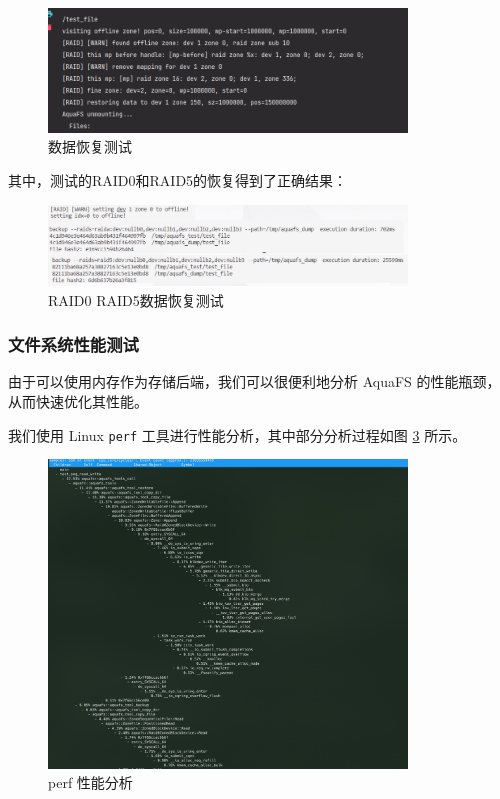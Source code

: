 \begin{figure}[htbp]
  \centering
  \includegraphics[width=0.85\textwidth]{fig/test-recovery}
  \caption{ 数据恢复测试 }
  \label{test-recovery}
\end{figure}

其中，测试的RAID0和RAID5的恢复得到了正确结果：
\begin{figure}[htbp]
  \centering
  \includegraphics[width=0.85\textwidth]{fig/test_recovery_1}
  \caption{ RAID0 RAID5数据恢复测试 }
  \label{test-recovery_1}
\end{figure}

\subsubsection{文件系统性能测试}

由于可以使用内存作为存储后端，我们可以很便利地分析 AquaFS 的性能瓶颈，从而快速优化其性能。

我们使用 Linux \verb|perf| 工具进行性能分析，其中部分分析过程如图 \ref{test-perf} 所示。

\begin{figure}[htbp]
  \centering
  \includegraphics[width=0.85\textwidth]{fig/test-perf}
  \caption{ perf 性能分析 }
  \label{test-perf}
\end{figure}

